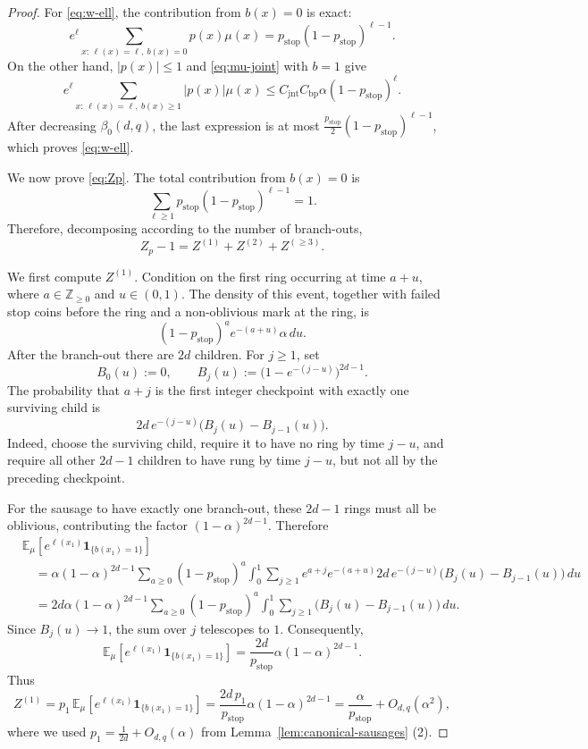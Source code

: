 \documentclass[letterpaper,11pt,reqno]{amsart}
\theoremstyle{definition}
\begin{document}
\begin{proof}
For \eqref{eq:w-ell}, the contribution from \(b(x)=0\) is exact:
\[
e^\ell
\sum_{x:\,\ell(x)=\ell,\ b(x)=0}p(x)\mu(x)
=
p_{\mathrm{stop}}(1-p_{\mathrm{stop}})^{\ell-1}.
\]
On the other hand, \(|p(x)|\le1\) and \eqref{eq:mu-joint} with \(b=1\) give
\[
e^\ell
\sum_{x:\,\ell(x)=\ell,\ b(x)\ge1}|p(x)|\mu(x)
\le
C_{\mathrm{jnt}}C_{\mathrm{bp}}\alpha
(1-p_{\mathrm{stop}})^\ell.
\]
After decreasing \(\beta_0(d,q)\), the last expression is at most
$\frac{p_{\mathrm{stop}}}{2}
(1-p_{\mathrm{stop}})^{\ell-1}$,
which proves \eqref{eq:w-ell}.

We now prove \eqref{eq:Zp}. The total contribution from \(b(x)=0\) is
\[
\sum_{\ell\ge1}
p_{\mathrm{stop}}(1-p_{\mathrm{stop}})^{\ell-1}
=1.
\]
Therefore, decomposing according to the number of branch-outs,
\[
Z_p-1=Z^{(1)}+Z^{(2)}+Z^{(\ge3)}.
\]

We first compute \(Z^{(1)}\). Condition on the first ring occurring at
time \(a+u\), where \(a\in\mathbb Z_{\ge0}\) and \(u\in(0,1)\).
The density of this event, together with failed stop coins before the
ring and a non-oblivious mark at the ring, is
\[
(1-p_{\mathrm{stop}})^a e^{-(a+u)}\alpha\,du.
\]
After the branch-out there are \(2d\) children. For \(j\ge1\), set
\[
    B_0(u):=0,
    \qquad
    B_j(u):=
    \bigl(1-e^{-(j-u)}\bigr)^{2d-1}.
\]
The probability that \(a+j\) is the first integer checkpoint with
exactly one surviving child is
\[
    2d\,e^{-(j-u)}
    \bigl(B_j(u)-B_{j-1}(u)\bigr).
\]
Indeed, choose the surviving child, require it to have no ring by time
\(j-u\), and require all other \(2d-1\) children to have rung by time
\(j-u\), but not all by the preceding checkpoint.

For the sausage to have exactly one branch-out, these \(2d-1\) rings
must all be oblivious, contributing the factor
\((1-\alpha)^{2d-1}\). Therefore
\begin{align*}
&\mathbb E_\mu\!\left[
e^{\ell(x_1)}\mathbf 1_{\{b(x_1)=1\}}
\right]\\
&\quad=
\alpha(1-\alpha)^{2d-1}
\sum_{a\ge0}(1-p_{\mathrm{stop}})^a
\int_0^1
\sum_{j\ge1}
e^{a+j}e^{-(a+u)}
2d\,e^{-(j-u)}
\bigl(B_j(u)-B_{j-1}(u)\bigr)\,du\\
&\quad=
2d\alpha(1-\alpha)^{2d-1}
\sum_{a\ge0}(1-p_{\mathrm{stop}})^a
\int_0^1
\sum_{j\ge1}
\bigl(B_j(u)-B_{j-1}(u)\bigr)\,du.
\end{align*}
Since \(B_j(u)\to1\), the sum over \(j\) telescopes to \(1\).
Consequently,
\[
\mathbb E_\mu\!\left[
e^{\ell(x_1)}\mathbf 1_{\{b(x_1)=1\}}
\right]
=
\frac{2d}{p_{\mathrm{stop}}}
\alpha(1-\alpha)^{2d-1}.
\]
Thus
\[
Z^{(1)}
=
p_1\,
\mathbb E_\mu\!\left[
e^{\ell(x_1)}\mathbf 1_{\{b(x_1)=1\}}
\right]
=
\frac{2d\,p_1}{p_{\mathrm{stop}}}
\alpha(1-\alpha)^{2d-1}
=
\frac{\alpha}{p_{\mathrm{stop}}}
+O_{d,q}(\alpha^2),
\]
where we used $p_1=\frac1{2d}+O_{d,q}(\alpha)$ from Lemma~\ref{lem:canonical-sausages} (2).



\end{proof}
\end{document}
